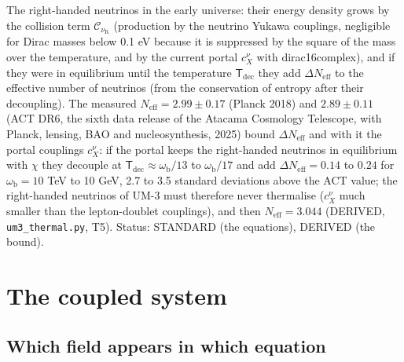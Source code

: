 \documentclass[
  10pt,
]{article}
\begin{document}
The right-handed neutrinos in the early universe: their energy density
grows by the collision term \(\mathcal{C}_{\nu_{\mathrm{R}}}\)
(production by the neutrino Yukawa couplings, negligible for Dirac
masses below 0.1 eV because it is suppressed by the square of the mass
over the temperature, and by the current portal \(c^{\nu}_X\) with
dirac16complex), and if they were in equilibrium until the temperature
\(\mathsf{T}_{\mathrm{dec}}\) they add \(\Delta N_{\mathrm{eff}}\) to
the effective number of neutrinos (from the conservation of entropy
after their decoupling). The measured
\(N_{\mathrm{eff}} = 2.99 \pm 0.17\) (Planck 2018) and \(2.89 \pm 0.11\)
(ACT DR6, the sixth data release of the Atacama Cosmology Telescope,
with Planck, lensing, BAO and nucleosynthesis, 2025) bound
\(\Delta N_{\mathrm{eff}}\) and with it the portal couplings
\(c^{\nu}_X\): if the portal keeps the right-handed neutrinos in
equilibrium with \(\chi\) they decouple at
\(\mathsf{T}_{\mathrm{dec}} \approx \omega_{\mathrm{b}}/13\) to
\(\omega_{\mathrm{b}}/17\) and add \(\Delta N_{\mathrm{eff}} = 0.14\) to
\(0.24\) for \(\omega_{\mathrm{b}} = 10\) TeV to 10 GeV, 2.7 to 3.5
standard deviations above the ACT value; the right-handed neutrinos of
UM-3 must therefore never thermalise (\(c^{\nu}_X\) much smaller than
the lepton-doublet couplings), and then \(N_{\mathrm{eff}} = 3.044\)
(DERIVED, \texttt{um3\_thermal.py}, T5). Status: STANDARD (the
equations), DERIVED (the bound).

\hypertarget{the-coupled-system}{%
\section{The coupled system}\label{the-coupled-system}}

\hypertarget{which-field-appears-in-which-equation}{%
\subsection{Which field appears in which
equation}\label{which-field-appears-in-which-equation}}
\end{document}
